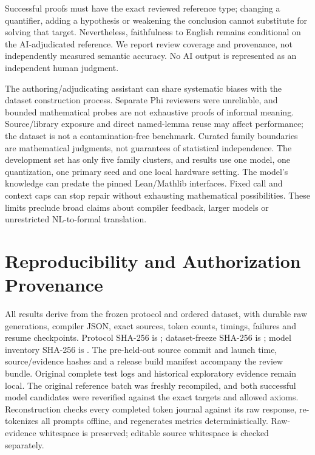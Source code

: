 \documentclass[runningheads,a4paper]{llncs}
\begin{document}
Successful proofs must have the exact reviewed reference type; changing a
quantifier, adding a hypothesis or weakening the conclusion cannot substitute
for solving that target. Nevertheless, faithfulness to English remains
conditional on the AI-adjudicated reference. We report review coverage and
provenance, not independently measured semantic accuracy. No AI output is
represented as an independent human judgment.

The authoring/adjudicating assistant can share systematic biases with the
dataset construction process. Separate Phi reviewers were unreliable, and
bounded mathematical probes are not exhaustive proofs of informal meaning.
Source/library exposure and direct named-lemma reuse may affect performance;
the dataset is not a contamination-free benchmark. Curated family boundaries
are mathematical judgments, not guarantees of statistical independence. The
development set has only five family clusters, and results use one model,
one quantization, one primary seed and one local hardware setting. The model's
knowledge can predate the pinned Lean/Mathlib interfaces. Fixed call and context
caps can stop repair without exhausting mathematical possibilities. These
limits preclude broad claims about compiler feedback, larger models or
unrestricted NL-to-formal translation.

\section{Reproducibility and Authorization Provenance}
All results derive from the frozen protocol and ordered dataset, with durable
raw generations, compiler JSON, exact sources, token counts, timings, failures
and resume checkpoints. Protocol SHA-256 is
; dataset-freeze SHA-256 is
; model inventory SHA-256 is
. The pre-held-out source commit and launch time,
source/evidence hashes and a release build manifest accompany the review bundle.
Original complete test logs and historical exploratory evidence remain local.
The original reference batch was freshly recompiled, and both successful model
candidates were reverified against the exact targets and allowed axioms.
Reconstruction checks every completed token journal against its raw response,
re-tokenizes all prompts offline, and regenerates metrics deterministically.
Raw-evidence whitespace is preserved; editable source whitespace is checked separately.
\end{document}
